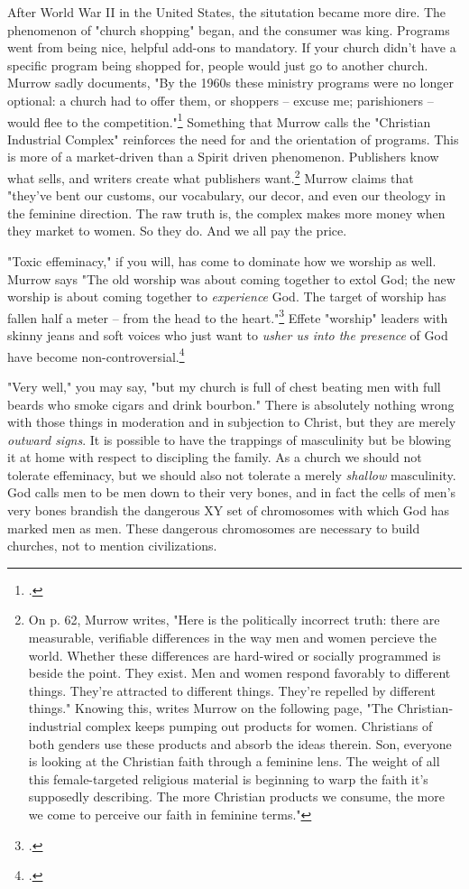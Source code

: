 \documentclass[justified, nobib]{tufte-handout}
\begin{document}
After World War II in the United States, the situtation became more dire.  The phenomenon of "church shopping" began, and the consumer was king.  Programs went from being nice, helpful add-ons to mandatory.  If your church didn't have a specific program being shopped for, people would just go to another church.  Murrow sadly documents, "By the 1960s these ministry programs were no longer optional: a church had to offer them, or shoppers -- excuse me; parishioners -- would flee to the competition."\footcite[p. 60]{murrowmen} Something that Murrow calls the "Christian Industrial Complex" reinforces the need for and the orientation of programs.  This is more of a market-driven than a Spirit driven phenomenon.  Publishers know what sells, and writers create what publishers want.\footnote{On p. 62, Murrow writes, "Here is the politically incorrect truth: there are measurable, verifiable differences in the way men and women percieve the world.  Whether these differences are hard-wired or socially programmed is beside the point.  They exist.  Men and women respond favorably to different things.  They're attracted to different things.  They're repelled by different things."  Knowing this, writes Murrow on the following page, "The Christian-industrial complex keeps pumping out products for women.  Christians of both genders use these products and absorb the ideas therein.  Son, everyone is looking at the Christian faith through a feminine lens.  The weight of all this female-targeted religious material is beginning to warp the faith it's supposedly describing.  The more Christian products we consume, the more we come to perceive our faith in feminine terms."}  Murrow claims that "they've bent our customs, our vocabulary, our decor, and even our theology in the feminine direction.  The raw truth is, the complex makes more money when they market to women.  So they do.  And we all pay the price.

"Toxic effeminacy," if you will, has come to dominate how we worship as well.  Murrow says "The old worship was about coming together to extol God; the new worship is about coming together to \textit{experience} God.  The target of worship has fallen half a meter -- from the head to the heart."\footcite[p. 70]{murrowmen} Effete "worship" leaders with skinny jeans and soft voices who just want to \textit{usher us into the presence} of God have become non-controversial.\footcite[p. 76]{murrowmen}

"Very well," you may say, "but my church is full of chest beating men with full beards who smoke cigars and drink bourbon."  There is absolutely nothing wrong with those things in moderation and in subjection to Christ, but they are merely \textit{outward signs}.  It is possible to have the trappings of masculinity but be blowing it at home with respect to discipling the family.  As a church we should not tolerate effeminacy, but we should also not tolerate a merely \textit{shallow} masculinity.  God calls men to be men down to their very bones, and in fact the cells of men's very bones brandish the dangerous XY set of chromosomes with which God has marked men as men.  These dangerous chromosomes are necessary to build churches, not to mention civilizations.
\end{document}
